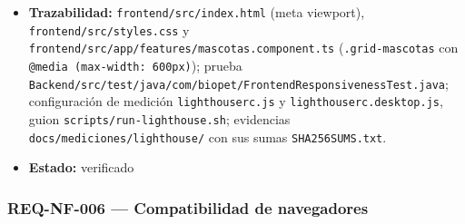 \documentclass[
  spanish,
]{article}
\begin{document}
\begin{itemize}
  \texttt{@media\ (max-\allowbreak{}width:\ 600px)} (línea 45), y de la regla
  \texttt{.\allowbreak{}grid-\allowbreak{}mascotas} de
  \texttt{frontend/\allowbreak{}src/\allowbreak{}app/\allowbreak{}features/\allowbreak{}mascotas.\allowbreak{}component.\allowbreak{}ts}.
\item
  \textbf{Trazabilidad:} \texttt{frontend/\allowbreak{}src/\allowbreak{}index.\allowbreak{}html} (meta
  viewport), \texttt{frontend/\allowbreak{}src/\allowbreak{}styles.\allowbreak{}css} y
  \texttt{frontend/\allowbreak{}src/\allowbreak{}app/\allowbreak{}features/\allowbreak{}mascotas.\allowbreak{}component.\allowbreak{}ts}
  (\texttt{.\allowbreak{}grid-\allowbreak{}mascotas} con \texttt{@media\ (max-\allowbreak{}width:\ 600px)});
  prueba
  \texttt{Backend/\allowbreak{}src/\allowbreak{}test/\allowbreak{}java/\allowbreak{}com/\allowbreak{}biopet/\allowbreak{}Frontend\allowbreak{}Responsiveness\allowbreak{}Test.\allowbreak{}java};
  configuración de medición \texttt{lighthouserc.\allowbreak{}js} y
  \texttt{lighthouserc.\allowbreak{}desktop.\allowbreak{}js}, guion
  \texttt{scripts/\allowbreak{}run-\allowbreak{}lighthouse.\allowbreak{}sh}; evidencias
  \texttt{docs/\allowbreak{}mediciones/\allowbreak{}lighthouse/} con sus sumas
  \texttt{SHA256\allowbreak{}SUMS.\allowbreak{}txt}.
\item
  \textbf{Estado:} verificado
\end{itemize}

\subsubsection{REQ-NF-006 --- Compatibilidad de
navegadores}\label{req-nf-006-compatibilidad-de-navegadores}
\end{document}

